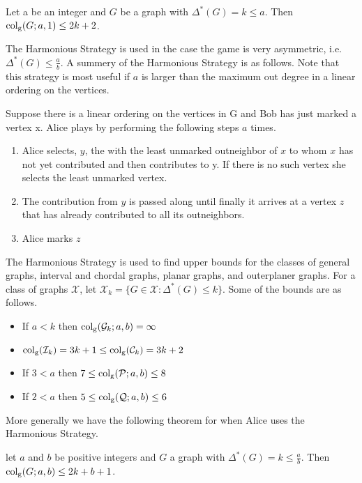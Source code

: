 \begin{theorem}\label{thm:kiYa2005}
    Let a be an integer and $G$ be a graph with $\Delta^*(G) = k\leq a$. Then
    $\operatorname{col_g}(G;a,1) \leq 2k + 2$.
\end{theorem}

The Harmonious Strategy is used in the case the game is very asymmetric, i.e. $\Delta^*(G)\leq \frac{a}{b}$. A summery of the Harmonious Strategy is as follows. Note that this strategy is most useful if $a$ is larger than the maximum out degree in a linear ordering on the vertices.

Suppose there is a linear ordering on the vertices in G and Bob has just marked a vertex x. Alice plays by performing the following steps $a$ times.    
\begin{enumerate}
    \item  Alice selects, $y$, the with the least unmarked outneighbor of $x$ to whom $x$ has not yet contributed and then contributes to y. If there is no such vertex she selects the least unmarked vertex.
    \item  The contribution from $y$
    is passed along until finally it arrives at a vertex $z$ that has already
    contributed to all its outneighbors.
    \item  Alice marks $z$
\end{enumerate}

The Harmonious Strategy is used to find upper bounds for the classes of general graphs, interval and chordal graphs, planar graphs, and outerplaner graphs. For a class of graphs $\mathcal{X}$, let $\mathcal{X}_k= \{G\in\mathcal{X}: \Delta^*(G)\leq k\}$. Some of the bounds are as follows.    
\begin{itemize}
    \item If $a < k$ then $\operatorname{col_g}(\mathcal{G}_k;a,b)=\infty$
    \item $\operatorname{col_g}(\mathcal{I}_k)=3k+1\leq\operatorname{col_g}(\mathcal{C}_k)=3k+2$
    \item If $3<a $ then $7\leq \operatorname{col_g}(\mathcal{P};a,b)\leq 8$
    \item If $2< a$ then $5\leq \operatorname{col_g}(\mathcal{Q};a,b)\leq 6$
\end{itemize}
More generally we have the following theorem for when Alice uses the Harmonious Strategy.
\begin{theorem}
    let $a$ and $b$ be positive integers and $G$ a graph with $\Delta^*(G)=k\leq\frac{a}{b}$. Then $\operatorname{col_g}(G;a,b)\leq 2k+b+1$.
\end{theorem}

